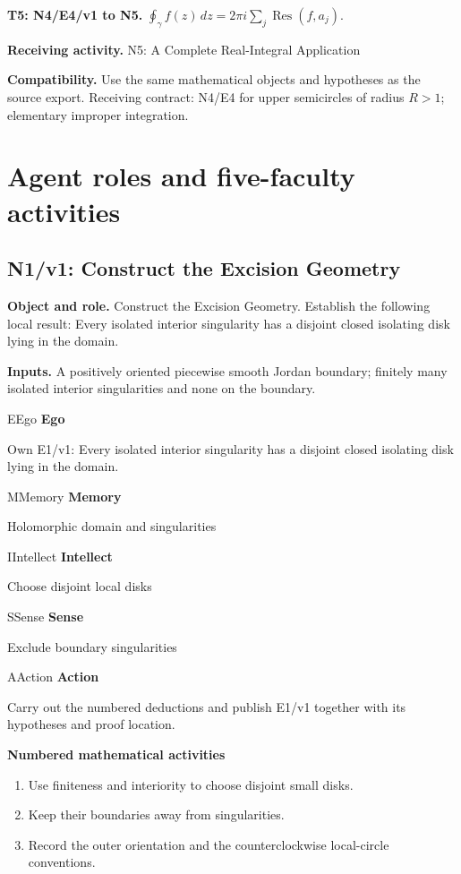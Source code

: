 \documentclass[preprint,12pt,aps,pra,showkeys,amsmath,amssymb,superscriptaddress,floatfix]{revtex4-2}
\theoremstyle{definition}
\theoremstyle{remark}
\newcommand{\mmfaculty}[3]{%
 \begin{mmfacultybox}{#1}{#2}
 {\sffamily\bfseries\color{MMBlue}#2}\par\smallskip #3
 \end{mmfacultybox}}
\newcommand{\field}[2]{\par\smallskip\noindent\textbf{#1.} #2\par}
\begin{document}
\field{T5: N4/E4/v1 to N5}{\(\oint_\gamma f(z)\,dz=2\pi i\sum_j\operatorname{Res}(f,a_j)\).}

\field{Receiving activity}{N5: A Complete Real-Integral Application}

\field{Compatibility}{Use the same mathematical objects and hypotheses as the source export.
Receiving contract: N4/E4 for upper semicircles of radius \(R>1\);
elementary improper integration.}

\endgroup

\clearpage\section{Agent roles and five-faculty activities}\begingroup\small\linespread{1.05}\selectfont{}

\subsection{N1/v1: Construct the Excision Geometry}

\field{Object and role}{Construct the Excision Geometry. Establish the following local result:
Every isolated interior singularity has a disjoint closed isolating disk
lying in the domain.}

\field{Inputs}{A positively oriented piecewise smooth Jordan boundary; finitely many
isolated interior singularities and none on the boundary.}

\mmfaculty{E}{Ego}{Own E1/v1: Every isolated interior singularity has a disjoint closed
isolating disk lying in the domain.}

\mmfaculty{M}{Memory}{Holomorphic domain and singularities}

\mmfaculty{I}{Intellect}{Choose disjoint local disks}

\mmfaculty{S}{Sense}{Exclude boundary singularities}

\mmfaculty{A}{Action}{Carry out the numbered deductions and publish E1/v1 together with its
hypotheses and proof location.}

\smallskip\noindent\textbf{Numbered mathematical activities}

\begin{enumerate}[label=N1.\arabic*,leftmargin=3.4em]

\item Use finiteness and interiority to choose disjoint small disks.

\item Keep their boundaries away from singularities.

\item Record the outer orientation and the counterclockwise local-circle
conventions.

\end{enumerate}
\end{document}
